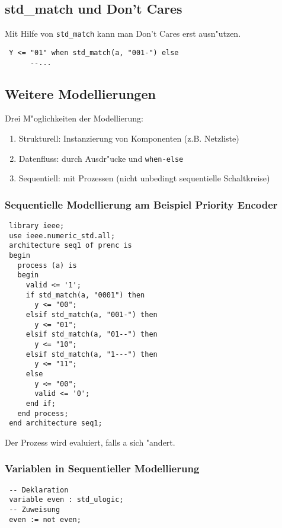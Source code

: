 \documentclass[german, 10pt, a4paper, twocolumn]{scrartcl}
\theoremstyle{definition}
\begin{document}
\subsection{std\_match und Don't Cares}

Mit Hilfe von \verb#std_match# kann man Don't Cares erst ausn"utzen.

\begin{verbatim}
 Y <= "01" when std_match(a, "001-") else
      --...
\end{verbatim}

\subsection{Weitere Modellierungen}

Drei M"oglichkeiten der Modellierung:
\begin{enumerate}
	\item Strukturell: Instanzierung von Komponenten (z.B. Netzliste)
	\item Datenfluss: durch Ausdr"ucke und \verb#when-else#
	\item Sequentiell: mit Prozessen (nicht unbedingt sequentielle Schaltkreise)
\end{enumerate}

\subsubsection{Sequentielle Modellierung am Beispiel Priority Encoder}

\begin{verbatim}
 library ieee;
 use ieee.numeric_std.all;
 architecture seq1 of prenc is
 begin
   process (a) is
   begin
     valid <= '1';
     if std_match(a, "0001") then
       y <= "00";
     elsif std_match(a, "001-") then
       y <= "01";
     elsif std_match(a, "01--") then
       y <= "10";
     elsif std_match(a, "1---") then
       y <= "11";
     else
       y <= "00";
       valid <= '0';
     end if;
   end process;
 end architecture seq1;
\end{verbatim}

Der Prozess wird evaluiert, falls a sich "andert.

\subsubsection{Variablen in Sequentieller Modellierung}

\begin{verbatim}
 -- Deklaration
 variable even : std_ulogic;
 -- Zuweisung
 even := not even;
\end{verbatim}
\end{document}
